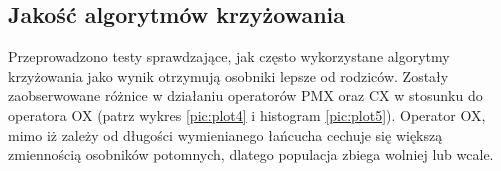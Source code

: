 \documentclass[12pt]{article}
\begin{document}
\subsection{Jakość algorytmów krzyżowania}

Przeprowadzono testy sprawdzające, jak często wykorzystane algorytmy
krzyżowania jako wynik otrzymują osobniki lepsze od rodziców. Zostały
zaobserwowane różnice w działaniu operatorów PMX oraz CX w stosunku do operatora 
OX (patrz wykres \ref{pic:plot4} i histogram \ref{pic:plot5}).
Operator OX, mimo iż zależy od długości wymienianego łańcucha cechuje się większą
zmiennością osobników potomnych, dlatego populacja zbiega wolniej lub wcale.
\end{document}

